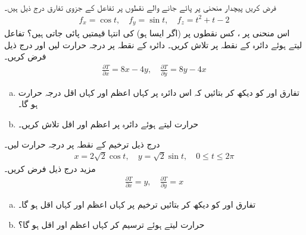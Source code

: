 \\
فرض کریں پیچدار منحنی  پر  پائے جانے والے نقطوں پر تفاعل   کے جزوی تفارق درج ذیل ہیں۔
\begin{align*}
f_x=\cos t,\quad f_y=\sin t,\quad f_z=t^2+t-2
\end{align*}
اس منحنی پر ، کس نقطوں پر  (اگر ایسا ہو)   کی انتہا  قیمتیں  پائی جاتی ہیں؟
تفاعل  لیتے ہوئے  دائرہ   کے  نقطہ  پر  تلاش کریں۔  
دائرہ  کے نقطہ   پر درجہ حرارت   لیں اور درج ذیل فرض کریں۔
\begin{align*}
\frac{\partial T}{\partial x}=8x-4y,\quad \frac{\partial T}{\partial y}=8y-4x
\end{align*}
\begin{enumerate}[a.]
\item
تفارق  اور  کو دیکھ کر بتائیں کہ اس دائرہ پر کہاں اعظم اور کہاں اقل درجہ حرارت ہو گا۔
\item
حرارت    لیتے ہوئے دائرہ پر  اعظم اور اقل  تلاش کریں۔
\end{enumerate}
درج ذیل ترخیم  کے نقطہ  پر درجہ حرارت  لیں۔
\begin{align*}
x=2\sqrt{2}\cos t,\quad y=\sqrt{2}\sin t,\quad 0\le t\le 2\pi
\end{align*}
مزید  درج ذیل فرض کریں۔
\begin{align*}
\frac{\partial T}{\partial x}=y,\quad \frac{\partial T}{\partial y}=x
\end{align*}
\begin{enumerate}[a.]
\item
تفارق  اور  کو دیکھ کر بتائیں  ترخیم پر  کہاں اعظم   اور  کہاں اقل  ہو گا۔
\item
حرارت  لیتے ہوئے ترسیم کر کہاں  اعظم  اور  اقل   ہو گا؟
\end{enumerate}
